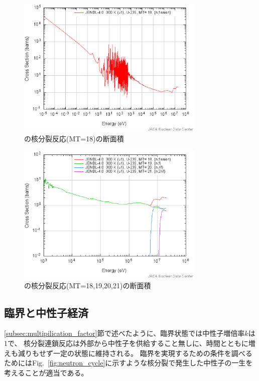 \begin{figure}[htbp]
  \centering
  \includegraphics[width=0.8\textwidth]{figure/U235Fission.eps}
  \caption{の核分裂反応(MT=18)の断面積}
  \label{fig:neutron_fission}
\end{figure}

\begin{figure}[htbp]
  \centering
  \includegraphics[width=0.8\textwidth]{figure/U235Fiss_xnf.eps}
  \caption{の核分裂反応(MT=18,19,20,21)の断面積}
  \label{fig:neutron_fission_U238}
\end{figure}

\subsection{臨界と中性子経済}
\ref{subsec:multipilication_factor}節で述べたように、臨界状態では中性子増倍率$k$は1で、
核分裂連鎖反応は外部から中性子を供給すること無しに、時間とともに増えも減りもせず一定の状態に維持される。
臨界を実現するための条件を調べるためにはFig.~\ref{fig:neutron_cycle}に示すような核分裂で発生した中性子の一生を考えることが適当である。

